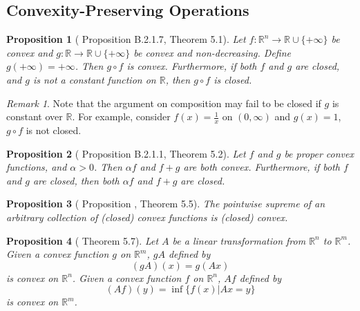 \documentclass[openany]{book}
\newtheorem{proposition}{Proposition}[chapter]
\theoremstyle{definition}
\theoremstyle{remark}
\newtheorem*{remark}{Remark}
\begin{document}
\subsection{Convexity-Preserving Operations}
\begin{proposition}[\cite{HL12} Proposition B.2.1.7, \cite{R15} Theorem 5.1]
    Let $f:\mathbb{R}^n\to \mathbb{R}\cup\{+\infty\}$ be convex and $g:\mathbb{R}\to \mathbb{R}\cup\{+\infty\}$ be convex and  non-decreasing. Define $g(+\infty)=+\infty$. Then $g\circ f$ is convex. Furthermore, if both $f$ and $g$ are closed, and $g$ is not a constant function on $\mathbb{R}$, then $g\circ f$ is closed.
\end{proposition}
\begin{remark}
    Note that the argument on composition may fail to be closed if  $g$ is constant over $\mathbb{R}$. For example, consider $f(x)=\frac{1}{x}$ on $(0,\infty)$ and $g(x)=1$, $g\circ f$ is not closed.
\end{remark}
\begin{proposition}[\cite{HL12} Proposition B.2.1.1, \cite{R15} Theorem 5.2]
    Let $f$ and $g$ be proper convex functions, and $\alpha>0$. Then $\alpha f$ and $f+g$ are both convex. Furthermore, if both $f$ and $g$ are closed, then both $\alpha f$ and $f+g$ are closed.
\end{proposition}
\begin{proposition}[\cite{HL12} Proposition , \cite{R15} Theorem 5.5]
    The pointwise supreme of an arbitrary collection of (closed) convex functions is (closed) convex.
\end{proposition}
\begin{proposition}[\cite{R15} Theorem 5.7]
        Let $A$ be a linear transformation from $\mathbb{R}^n$ to $\mathbb{R}^m$. Given a convex function $g$ on $\mathbb{R}^m$, $gA$ defined by
        \begin{equation*}
            (gA)(x)=g(Ax)
        \end{equation*}
        is convex on $\mathbb{R}^n$. Given a convex function $f$ on $\mathbb{R}^n$, $Af$ defined by
        \begin{equation*}
            (Af)(y)=\inf\{f(x)|Ax=y\}
        \end{equation*}
        is convex on $\mathbb{R}^m$.
\end{proposition}
\end{document}
